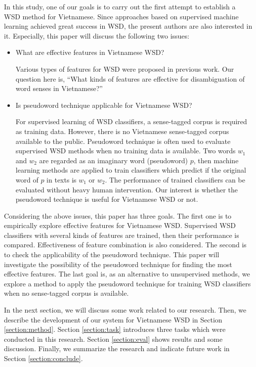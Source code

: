 \documentclass[english]{jnlp_1.4}
\begin{document}
In this study, 
one of our goals is to carry out the first attempt to establish a WSD method for Vietnamese. 
Since approaches based on supervised machine learning achieved great success in WSD, the present authors are also interested in it.
Especially, this paper will discuss the following two issues:
\begin{itemize}
\item What are effective features in Vietnamese WSD?

Various types of features for WSD were proposed in previous work.
Our question here is, ``What kinds of features are effective for disambiguation of word senses in Vietnamese?''
\item Is pseudoword technique applicable for Vietnamese WSD?

For supervised learning of WSD classifiers,
a sense-tagged corpus is required as training data.
However, there is no Vietnamese sense-tagged corpus available to the public.
Pseudoword technique is often used to evaluate supervised WSD methods when no training data is available.
Two words $w_1$ and $w_2$ are regarded as an imaginary word (pseudoword) $p$, 
then machine learning methods are applied to train classifiers which predict if the original word of $p$ in texts is $w_1$ or $w_2$.
The performance of trained classifiers can be evaluated without heavy human intervention.
Our interest is whether the pseudoword technique is useful for Vietnamese WSD or not.
\end{itemize}

Considering the above issues, this paper has three goals.
The first one is to empirically explore effective features for Vietnamese WSD.
Supervised WSD classifiers with several kinds of features are trained,
then their performance is compared.
Effectiveness of feature combination is also considered.
The second is to check the applicability of the pseudoword technique.
This paper will investigate the possibility of the pseudoword technique for finding the most effective features.
The last goal is, as an alternative to unsupervised methods,
we explore a method to apply the pseudoword technique for training WSD classifiers when no sense-tagged corpus is available.

In the next section, we will discuss some work related to our research. 
Then, we describe the development of our system for Vietnamese WSD in Section \ref{section:method}. 
Section \ref{section:task} introduces three tasks which were conducted in this research. 
Section \ref{section:eval} shows results and some discussion. 
Finally, we summarize the research and indicate future work in Section \ref{section:conclude}.
\end{document}
